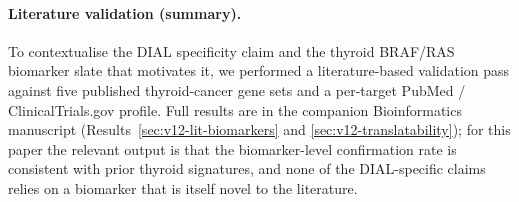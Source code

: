 \paragraph{Literature validation (summary).}
To contextualise the DIAL specificity claim and the thyroid BRAF/RAS biomarker slate that
motivates it, we performed a literature-based validation pass against five published
thyroid-cancer gene sets and a per-target PubMed / ClinicalTrials.gov profile. Full results
are in the companion Bioinformatics manuscript (Results~\ref{sec:v12-lit-biomarkers} and
\ref{sec:v12-translatability}); for this paper the relevant output is that the
biomarker-level confirmation rate is consistent with prior thyroid signatures, and none of
the DIAL-specific claims relies on a biomarker that is itself novel to the literature.
